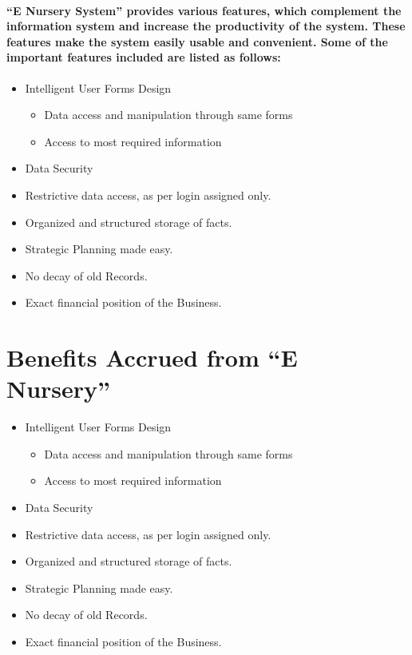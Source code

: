 \documentclass[12pt]{report}
\begin{document}
        \paragraph
        {
        “E Nursery System” provides various features, which complement the information system and increase the productivity of the system. These features make the system easily usable and convenient.  Some of the important features included are listed as follows:
        }
        \begin{itemize}
            \item Intelligent User Forms Design
            \begin{itemize}
                \item Data access and manipulation through same forms
                \item Access to most required information
            \end{itemize}
            
            \item Data Security 
            \item Restrictive data access, as per login assigned only.
            \item Organized and structured storage of facts.
            \item Strategic Planning made easy.
            \item No decay of old Records.
            \item Exact financial position of the Business.
        \end{itemize}
        
        \section{Benefits Accrued from “E Nursery”}
        \begin{itemize}
            \item Intelligent User Forms Design
            \begin{itemize}
                \item Data access and manipulation through same forms
                \item Access to most required information
            \end{itemize}
            
            \item Data Security 
            \item Restrictive data access, as per login assigned only.
            \item Organized and structured storage of facts.
            \item Strategic Planning made easy.
            \item No decay of old Records.
            \item Exact financial position of the Business.
        \end{itemize}
\end{document}
